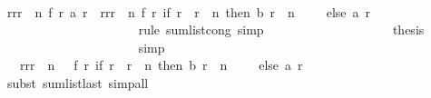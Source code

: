 \begin{isabellebody}
\ \ \ \ \ \ \ \ \ \ \ \ \ \ \ \ \isamarkupfalse%
{\isacharminus}\isanewline
\ \ \ \ \ \ \ \ \ \ \ \ \ \ \ \ \ \ \isamarkupfalse%
\ {\isachardoublequoteopen}{\isacharparenleft}{\isasymSum}r{\isacharprime}{\isasymleftarrow}{\isacharbrackleft}r{}{\isachardot}{\isachardot}{\isacharless}r{}\ {\isacharplus}\ n{\isacharbrackright}{\isachardot}\ f\ r{\isacharprime}\ {\isacharparenleft}a\ r{\isacharprime}{\isacharparenright}{\isacharparenright}\ {\isacharequal}\ {\isacharparenleft}{\isasymSum}r{\isacharprime}{\isasymleftarrow}{\isacharbrackleft}r{}{\isachardot}{\isachardot}{\isacharless}r{}\ {\isacharplus}\ n{\isacharbrackright}{\isachardot}\ f\ r{\isacharprime}\ {\isacharparenleft}if\ r{\isacharprime}\ {\isacharequal}\ r{}\ {\isacharplus}\ n\ then\ b\ {\isacharparenleft}r{}\ {\isacharplus}\ n\ {\isacharminus}\ {}{\isacharparenright}\ {\isacharplus}\ {}\ else\ {\isacharparenleft}a\ r{\isacharprime}{\isacharparenright}{\isacharparenright}{\isacharparenright}{\isachardoublequoteclose}\isanewline
\ \ \ \ \ \ \ \ \ \ \ \ \ \ \ \ \ \ \ \ \isamarkupfalse%
\ {\isacharparenleft}rule\ sum{\isacharunderscore}list{\isacharunderscore}cong{\isacharcomma}\ simp{\isacharparenright}\isanewline
\ \ \ \ \ \ \ \ \ \ \ \ \ \ \ \ \ \ \isamarkupfalse%
\ {\isacharquery}thesis\isanewline
\ \ \ \ \ \ \ \ \ \ \ \ \ \ \ \ \ \ \ \ \isamarkupfalse%
\ simp\isanewline
\ \ \ \ \ \ \ \ \ \ \ \ \ \ \ \ \isamarkupfalse%
\isanewline
\ \ \ \ \ \ \ \ \ \ \ \ \ \ \ \ \isamarkupfalse%
\ \isamarkupfalse%
\ {\isachardoublequoteopen}{\isachardot}{\isachardot}{\isachardot}\ {\isacharequal}\ {\isacharparenleft}{\isasymSum}r{\isacharprime}{\isasymleftarrow}{\isacharbrackleft}r{}{\isachardot}{\isachardot}{\isacharless}r{}\ {\isacharplus}\ n\ {\isacharplus}\ {}{\isacharbrackright}{\isachardot}\ f\ r{\isacharprime}\ {\isacharparenleft}if\ r{\isacharprime}\ {\isacharequal}\ r{}\ {\isacharplus}\ n\ then\ b\ {\isacharparenleft}r{}\ {\isacharplus}\ n\ {\isacharminus}\ {}{\isacharparenright}\ {\isacharplus}\ {}\ else\ {\isacharparenleft}a\ r{\isacharprime}{\isacharparenright}{\isacharparenright}{\isacharparenright}{\isachardoublequoteclose}\isanewline
\ \ \ \ \ \ \ \ \ \ \ \ \ \ \ \ \ \ \isamarkupfalse%
\ {\isacharparenleft}subst\ sum{\isacharunderscore}list{\isacharunderscore}last{\isacharcomma}\ simp{\isacharunderscore}all{\isacharparenright}\isanewline

\end{isabellebody}
